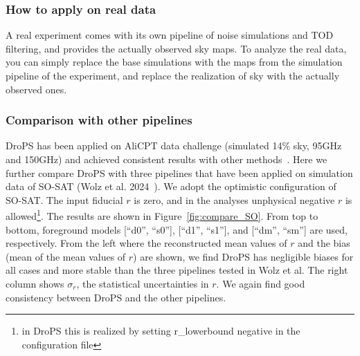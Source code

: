 \documentclass[12pt, a4paper]{ctexart} %
\begin{document}
\subsubsection{How to apply on real data}

A real experiment comes with its own pipeline of noise simulations and TOD filtering, and provides the actually observed sky maps. To analyze the real data, you can simply replace the base simulations with the maps from the simulation pipeline of the experiment, and replace the realization of sky with the actually observed ones.


\subsubsection{Comparison with other pipelines}

DroPS has been applied on AliCPT data challenge (simulated 14\% sky, 95GHz and 150GHz) and achieved consistent results with other methods~\cite{Zhang24}. Here we further compare DroPS with three pipelines that have been applied on simulation data of SO-SAT (Wolz et al. 2024~\cite{SO-SAT}). We adopt the optimistic configuration of SO-SAT. The input fiducial $r$ is zero, and in the analyses unphysical negative $r$ is allowed\footnote{in DroPS this is realized by setting r\_lowerbound negative in the configuration file}.  The results are shown in Figure~\ref{fig:compare_SO}.  From top to bottom, foreground models [``d0'', ``s0''], [``d1'', ``s1''], and [``dm'', ``sm''] are used, respectively. From the left where the reconstructed mean values of $r$ and the bias (mean of the mean values of $r$) are shown, we find DroPS has negligible biases for all cases and more stable than the three pipelines tested in Wolz et al. The right column shows $\sigma_r$, the statistical uncertainties in $r$. We again find good consistency between DroPS and the other pipelines.
\end{document}
